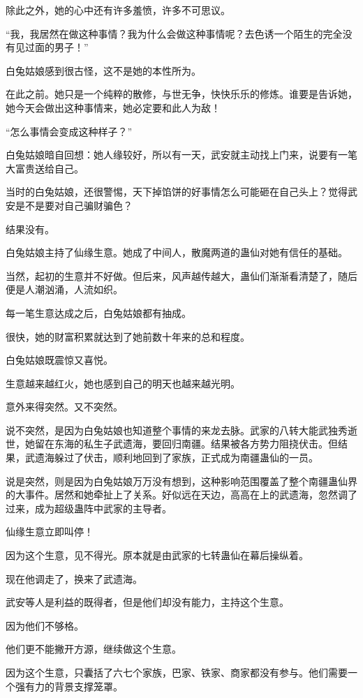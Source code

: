 \begin{this_body}
除此之外，她的心中还有许多羞愤，许多不可思议。

“我，我居然在做这种事情？我为什么会做这种事情呢？去色诱一个陌生的完全没有见过面的男子！”

白兔姑娘感到很古怪，这不是她的本性所为。

在此之前。她只是一个纯粹的散修，与世无争，快快乐乐的修炼。谁要是告诉她，她今天会做出这种事情来，她必定要和此人为敌！

“怎么事情会变成这种样子？”

白兔姑娘暗自回想：她人缘较好，所以有一天，武安就主动找上门来，说要有一笔大富贵送给自己。

当时的白兔姑娘，还很警惕，天下掉馅饼的好事情怎么可能砸在自己头上？觉得武安是不是要对自己骗财骗色？

结果没有。

白兔姑娘主持了仙缘生意。她成了中间人，散魔两道的蛊仙对她有信任的基础。

当然，起初的生意并不好做。但后来，风声越传越大，蛊仙们渐渐看清楚了，随后便是人潮汹涌，人流如织。

每一笔生意达成之后，白兔姑娘都有抽成。

很快，她的财富积累就达到了她前数十年来的总和程度。

白兔姑娘既震惊又喜悦。

生意越来越红火，她也感到自己的明天也越来越光明。

意外来得突然。又不突然。

说不突然，是因为白兔姑娘也知道整个事情的来龙去脉。武家的八转大能武独秀逝世，她留在东海的私生子武遗海，要回归南疆。结果被各方势力阻挠伏击。但结果，武遗海躲过了伏击，顺利地回到了家族，正式成为南疆蛊仙的一员。

说是突然，则是因为白兔姑娘万万没有想到，这种影响范围覆盖了整个南疆蛊仙界的大事件。居然和她牵扯上了关系。好似远在天边，高高在上的武遗海，忽然调了过来，成为超级蛊阵中武家的主导者。

仙缘生意立即叫停！

因为这个生意，见不得光。原本就是由武家的七转蛊仙在幕后操纵着。

现在他调走了，换来了武遗海。

武安等人是利益的既得者，但是他们却没有能力，主持这个生意。

因为他们不够格。

他们更不能撇开方源，继续做这个生意。

因为这个生意，只囊括了六七个家族，巴家、铁家、商家都没有参与。他们需要一个强有力的背景支撑笼罩。


\end{this_body}
